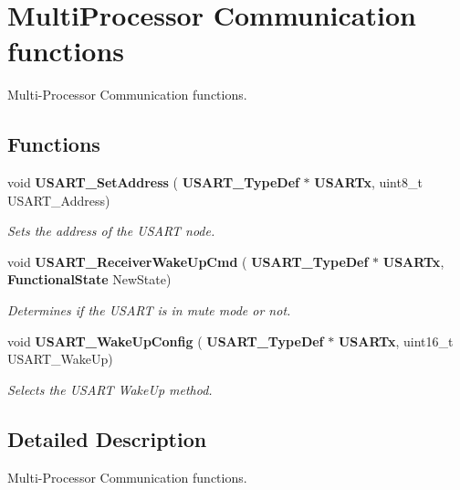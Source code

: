 \section{Multi\+Processor Communication functions}
\label{group__USART__Group3}


Multi-\/\+Processor Communication functions.  


\subsection*{Functions}
\begin{DoxyCompactItemize}
\item 
void \textbf{ U\+S\+A\+R\+T\+\_\+\+Set\+Address} (\textbf{ U\+S\+A\+R\+T\+\_\+\+Type\+Def} $\ast$\textbf{ U\+S\+A\+R\+Tx}, uint8\+\_\+t U\+S\+A\+R\+T\+\_\+\+Address)
\begin{DoxyCompactList}\small\item\em Sets the address of the U\+S\+A\+RT node. \end{DoxyCompactList}\item 
void \textbf{ U\+S\+A\+R\+T\+\_\+\+Receiver\+Wake\+Up\+Cmd} (\textbf{ U\+S\+A\+R\+T\+\_\+\+Type\+Def} $\ast$\textbf{ U\+S\+A\+R\+Tx}, \textbf{ Functional\+State} New\+State)
\begin{DoxyCompactList}\small\item\em Determines if the U\+S\+A\+RT is in mute mode or not. \end{DoxyCompactList}\item 
void \textbf{ U\+S\+A\+R\+T\+\_\+\+Wake\+Up\+Config} (\textbf{ U\+S\+A\+R\+T\+\_\+\+Type\+Def} $\ast$\textbf{ U\+S\+A\+R\+Tx}, uint16\+\_\+t U\+S\+A\+R\+T\+\_\+\+Wake\+Up)
\begin{DoxyCompactList}\small\item\em Selects the U\+S\+A\+RT Wake\+Up method. \end{DoxyCompactList}\end{DoxyCompactItemize}


\subsection{Detailed Description}
Multi-\/\+Processor Communication functions. 

